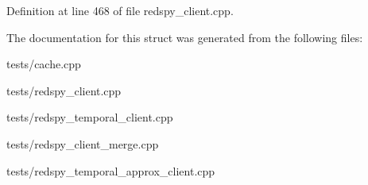 Definition at line 468 of file redspy\-\_\-client.\-cpp.



The documentation for this struct was generated from the following files\-:\begin{DoxyCompactItemize}
\item 
tests/cache.\-cpp\item 
tests/redspy\-\_\-client.\-cpp\item 
tests/redspy\-\_\-temporal\-\_\-client.\-cpp\item 
tests/redspy\-\_\-client\-\_\-merge.\-cpp\item 
tests/redspy\-\_\-temporal\-\_\-approx\-\_\-client.\-cpp\end{DoxyCompactItemize}
